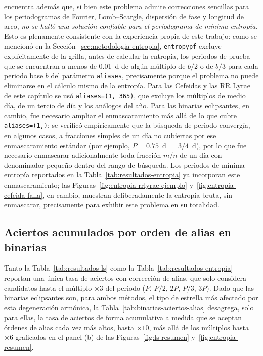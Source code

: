 \documentclass[12pt,letterpaper,oneside]{book}
\begin{document}
\citet{Henao2021} encuentra adem\'as que, si bien este problema admite correcciones sencillas para los periodogramas de Fourier, Lomb--Scargle, dispersi\'on de fase y longitud de arco, \emph{no se hall\'o una soluci\'on confiable para el periodograma de m\'inima entrop\'ia}. Esto es plenamente consistente con la experiencia propia de este trabajo: como se mencion\'o en la Secci\'on~\ref{sec:metodologia-entropia}, \texttt{entropypf} excluye expl\'icitamente de la grilla, antes de calcular la entrop\'ia, los periodos de prueba que se encuentran a menos de 0.01~d de alg\'un m\'ultiplo de $b/2$ o de $b/3$ para cada periodo base $b$ del par\'ametro \texttt{aliases}, precisamente porque el problema no puede eliminarse en el c\'alculo mismo de la entrop\'ia. Para las Cefeidas y las RR Lyrae de este cap\'itulo se us\'o \texttt{aliases=(1, 365)}, que excluye los m\'ultiplos de medio d\'ia, de un tercio de d\'ia y los an\'alogos del a\~no. Para las binarias eclipsantes, en cambio, fue necesario ampliar el enmascaramiento m\'as all\'a de lo que cubre \texttt{aliases=(1,)}: se verific\'o emp\'iricamente que la b\'usqueda de periodo converg\'ia, en algunos casos, a fracciones simples de un d\'ia no cubiertas por ese enmascaramiento est\'andar (por ejemplo, $P=0.75$~d $=3/4$~d), por lo que fue necesario enmascarar adicionalmente toda fracci\'on $m/n$ de un d\'ia con denominador peque\~no dentro del rango de b\'usqueda. Los periodos de m\'inima entrop\'ia reportados en la Tabla~\ref{tab:resultados-entropia} ya incorporan este enmascaramiento; las Figuras~\ref{fig:entropia-rrlyrae-ejemplo} y~\ref{fig:entropia-cefeida-falla}, en cambio, muestran deliberadamente la entrop\'ia bruta, sin enmascarar, precisamente para exhibir este problema en su totalidad.

\subsection{Aciertos acumulados por orden de alias en binarias}
\label{sec:resultados-binarias-alias}

Tanto la Tabla~\ref{tab:resultados-ls} como la Tabla~\ref{tab:resultados-entropia} reportan una \'unica tasa de aciertos con correcci\'on de alias, que solo considera candidatos hasta el m\'ultiplo $\times3$ del periodo ($P$, $P/2$, $2P$, $P/3$, $3P$). Dado que las binarias eclipsantes son, para ambos m\'etodos, el tipo de estrella m\'as afectado por esta degeneraci\'on arm\'onica, la Tabla~\ref{tab:binarias-aciertos-alias} desagrega, solo para ellas, la tasa de aciertos de forma acumulativa a medida que se aceptan \'ordenes de alias cada vez m\'as altos, hasta $\times10$, m\'as all\'a de los m\'ultiplos hasta $\times6$ graficados en el panel (b) de las Figuras~\ref{fig:ls-resumen} y~\ref{fig:entropia-resumen}.
\end{document}
